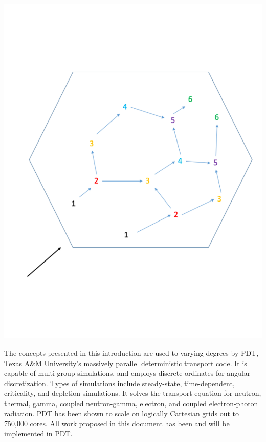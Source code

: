 \documentclass[11pt, letterpaper,titlepage,oneside]{article}
\begin{document}
\noindent\begin{minipage}{\textwidth}
\centering
\includegraphics[scale = 0.5]{tdg.pdf}
\label{tdg}
\end{minipage}
\smallskip

The concepts presented in this introduction are used to varying degrees by PDT, Texas A\&M University's massively parallel deterministic transport code. It is capable of multi-group simulations, and employs discrete ordinates for angular discretization. Types of simulations include steady-state, time-dependent, criticality, and depletion simulations. It solves the transport equation for neutron, thermal, gamma, coupled neutron-gamma, electron, and coupled electron-photon radiation. PDT  has been shown to scale on logically Cartesian grids out to 750,000 cores. All work proposed in this document has been and will be implemented in PDT. 

\end{document}
